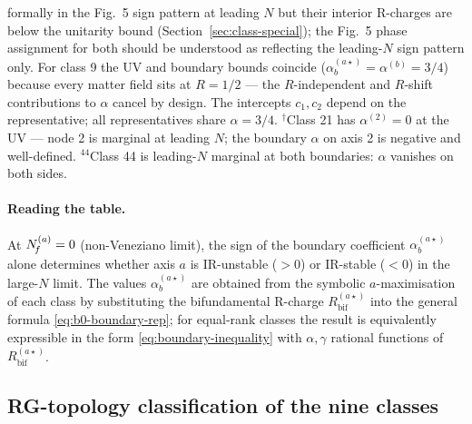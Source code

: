 \begin{table}[h]
{    formally in the Fig.~5 sign pattern at leading $N$ but their
    interior R-charges are below the unitarity bound
    (Section~\ref{sec:class-special}); the Fig.~5 phase assignment
    for both should be understood as reflecting the leading-$N$ sign
    pattern only.  For class 9 the UV and boundary bounds coincide
    ($\alpha_{b}^{(a\star)}=\alpha^{(b)}=3/4$) because every matter
    field sits at $R=1/2$ — the $R$-independent and
    $R$-shift contributions to $\alpha$ cancel by design.  The
    intercepts $c_{1},c_{2}$ depend on the representative; all
    representatives share $\alpha=3/4$.  $^{\dagger}$Class 21 has
    $\alpha^{(2)}=0$ at the UV — node 2 is marginal at leading $N$;
    the boundary $\alpha$ on axis 2 is negative and well-defined.
    $^{44}$Class 44 is leading-$N$ marginal at both boundaries:
    $\alpha$ vanishes on both sides.}
  \label{tab:b0-boundary}
\end{table}

\paragraph{Reading the table.}
At $N_{\!f}^{(a)}=0$ (non-Veneziano limit), the sign of the boundary
coefficient $\alpha_{b}^{(a\star)}$ alone determines whether axis $a$
is IR-unstable ($>0$) or IR-stable ($<0$) in the large-$N$ limit.
The values $\alpha_{b}^{(a\star)}$ are obtained from the symbolic
$a$-maximisation of each class by substituting the bifundamental
R-charge $R_{\text{bif}}^{(a\star)}$ into the general formula
\eqref{eq:b0-boundary-rep}; for equal-rank classes the result is
equivalently expressible in the form \eqref{eq:boundary-inequality}
with $\alpha,\gamma$ rational functions of $R_{\text{bif}}^{(a\star)}$.

\subsection{RG-topology classification of the nine classes}
\label{sec:boundary-phases}

